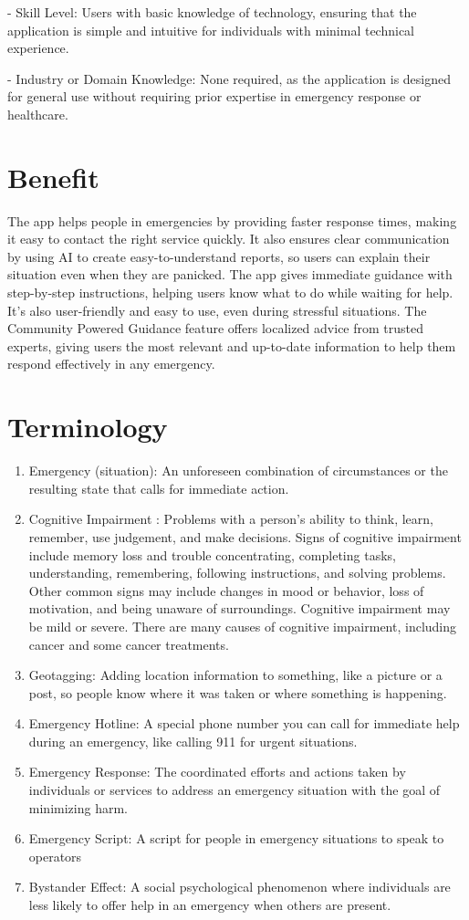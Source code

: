 - Skill Level: Users with basic knowledge of technology, ensuring that the application is simple and intuitive for individuals with minimal technical experience.

- Industry or Domain Knowledge: None required, as the application is designed for general use without requiring prior expertise in emergency response or healthcare.


\section{Benefit}
\label{section:benefit}
The app helps people in emergencies by providing faster response times, making it easy to contact the right service quickly. It also ensures clear communication by using AI to create easy-to-understand reports, so users can explain their situation even when they are panicked. The app gives immediate guidance with step-by-step instructions, helping users know what to do while waiting for help. It’s also user-friendly and easy to use, even during stressful situations. The Community Powered Guidance feature offers localized advice from trusted experts, giving users the most relevant and up-to-date information to help them respond effectively in any emergency.


\section{Terminology}
\label{section:terminology}

\begin{enumerate}
    \item Emergency (situation): An unforeseen combination of circumstances or the resulting state that calls for immediate action.
    \item Cognitive Impairment : Problems with a person’s ability to think, learn, remember, use judgement, and make decisions. Signs of cognitive impairment include memory loss and trouble concentrating, completing tasks, understanding, remembering, following instructions, and solving problems. Other common signs may include changes in mood or behavior, loss of motivation, and being unaware of surroundings. Cognitive impairment may be mild or severe. There are many causes of cognitive impairment, including cancer and some cancer treatments.
    \item Geotagging: Adding location information to something, like a picture or a post, so people know where it was taken or where something is happening.
    \item Emergency Hotline: A special phone number you can call for immediate help during an emergency, like calling 911 for urgent situations.
    \item Emergency Response: The coordinated efforts and actions taken by individuals or services to address an emergency situation with the goal of minimizing harm.
    \item Emergency Script: A script for people in emergency situations to speak to operators
    \item Bystander Effect: A social psychological phenomenon where individuals are less likely to offer help in an emergency when others are present.
\end{enumerate}